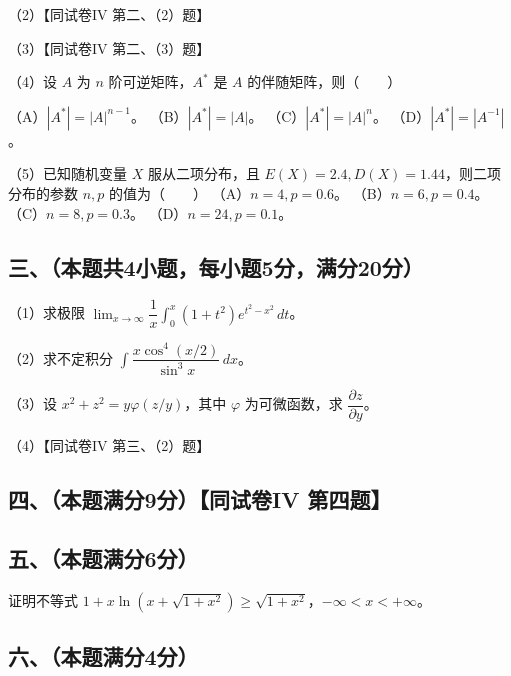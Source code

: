 \documentclass[UTF8,12pt]{ctexart}
\begin{document}
（2）【同试卷IV 第二、（2）题】


（3）【同试卷IV 第二、（3）题】


（4）设 \(\displaystyle A\) 为 \(\displaystyle n\) 阶可逆矩阵，\(\displaystyle A^*\) 是 \(\displaystyle A\) 的伴随矩阵，则（　　）


（A）\(\displaystyle |A^*|=|A|^{n-1}\)。 （B）\(\displaystyle |A^*|=|A|\)。 （C）\(\displaystyle |A^*|=|A|^n\)。 （D）\(\displaystyle |A^*|=|A^{-1}|\)。


（5）已知随机变量 \(\displaystyle X\) 服从二项分布，且 \(\displaystyle E(X)=2.4,\allowbreak D(X)=1.44\)，则二项分布的参数 \(\displaystyle n,\allowbreak p\) 的值为（　　） （A）\(\displaystyle n=4,\allowbreak p=0.6\)。 （B）\(\displaystyle n=6,\allowbreak p=0.4\)。 （C）\(\displaystyle n=8,\allowbreak p=0.3\)。 （D）\(\displaystyle n=24,\allowbreak p=0.1\)。


\subsection*{三、（本题共4小题，每小题5分，满分20分）}

（1）求极限 \(\displaystyle \lim_{x\to\infty}\dfrac{\displaystyle 1}{\displaystyle x}\displaystyle \int_0^x(1+t^2)e^{t^2-x^2}\,dt\)。


（2）求不定积分 \(\displaystyle \int\dfrac{\displaystyle x\cos^4(x/2)}{\displaystyle \sin^3x}\,dx\)。


（3）设 \(\displaystyle x^2+z^2=y\varphi(z/y)\)，其中 \(\displaystyle \varphi\) 为可微函数，求 \(\displaystyle \dfrac{\displaystyle \partial z}{\displaystyle \partial y}\)。


（4）【同试卷IV 第三、（2）题】


\subsection*{四、（本题满分9分）【同试卷IV 第四题】}

\subsection*{五、（本题满分6分）}

证明不等式 \(\displaystyle 1+x\ln(x+\sqrt{1+x^2})\ge\sqrt{1+x^2}\)，\(\displaystyle -\infty<x<+\infty\)。


\subsection*{六、（本题满分4分）}
\end{document}
